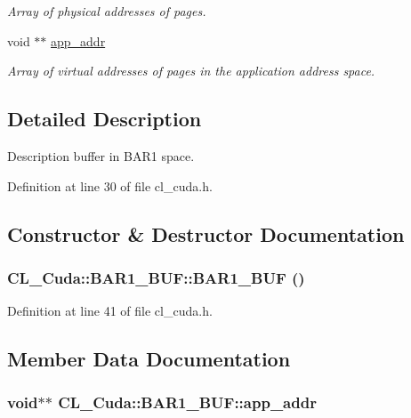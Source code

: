 \begin{DoxyCompactItemize}
\begin{DoxyCompactList}\small\item\em Array of physical addresses of pages. \item\end{DoxyCompactList}\item 
void $\ast$$\ast$ \hyperlink{structCL__Cuda_1_1BAR1__BUF_ad9ef1f7268bdba4d4727130e2d01627e}{app\_\-addr}
\begin{DoxyCompactList}\small\item\em Array of virtual addresses of pages in the application address space. \item\end{DoxyCompactList}\end{DoxyCompactItemize}


\subsection{Detailed Description}
Description buffer in BAR1 space. 

Definition at line 30 of file cl\_\-cuda.h.

\subsection{Constructor \& Destructor Documentation}
\hypertarget{structCL__Cuda_1_1BAR1__BUF_ace364e1455d4dfcd2e45ab70e310ed6a}{
\subsubsection[{BAR1\_\-BUF}]{\setlength{\rightskip}{0pt plus 5cm}CL\_\-Cuda::BAR1\_\-BUF::BAR1\_\-BUF ()}}
\label{structCL__Cuda_1_1BAR1__BUF_ace364e1455d4dfcd2e45ab70e310ed6a}


Definition at line 41 of file cl\_\-cuda.h.

\subsection{Member Data Documentation}
\hypertarget{structCL__Cuda_1_1BAR1__BUF_ad9ef1f7268bdba4d4727130e2d01627e}{
\subsubsection[{app\_\-addr}]{\setlength{\rightskip}{0pt plus 5cm}void$\ast$$\ast$ {\bf CL\_\-Cuda::BAR1\_\-BUF::app\_\-addr}}}
\label{structCL__Cuda_1_1BAR1__BUF_ad9ef1f7268bdba4d4727130e2d01627e}


